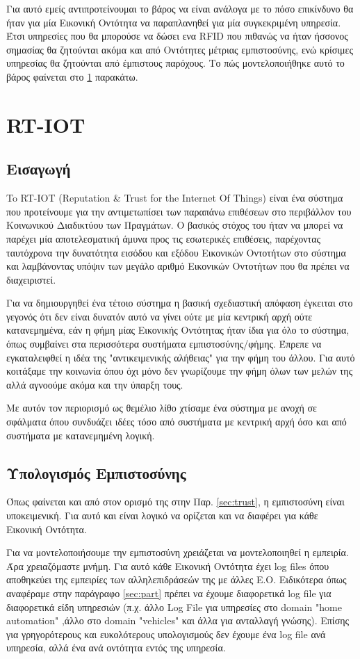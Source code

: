 Για αυτό εμείς αντιπροτείνουμαι το βάρος να είναι ανάλογα με το πόσο επικίνδυνο θα ήταν για μία Εικονική Οντότητα να παραπλανηθεί για μία συγκεκριμένη υπηρεσία. Έτσι υπηρεσίες που θα μπορούσε να δώσει ενα RFID  που πιθανώς να ήταν ήσσονος σημασίας θα ζητούνται ακόμα και από Οντότητες μέτριας εμπιστοσύνης, ενώ κρίσιμες υπηρεσίας θα ζητούνται από έμπιστους παρόχους. Το πώς μοντελοποιήθηκε αυτό το βάρος φαίνεται στο \ref{sec:RT-IOT} παρακάτω.
\newpage
\section{RT-IOT}\label{sec:RT-IOT}
\subsection{Εισαγωγή}
To RT-IOT (Reputation \& Trust for the Internet Of Things) είναι ένα σύστημα που προτείνουμε για την αντιμετωπίσει των παραπάνω επιθέσεων στο περιβάλλον του Κοινωνικού Διαδικτύου των Πραγμάτων. Ο βασικός στόχος του ήταν να μπορεί να παρέχει μία αποτελεσματική άμυνα προς τις εσωτερικές επιθέσεις, παρέχοντας ταυτόχρονα την δυνατότητα εισόδου και εξόδου Εικονικών Οντοτήτων στο σύστημα 
και λαμβάνοντας υπόψιν των μεγάλο αριθμό Εικονικών Οντοτήτων που θα πρέπει να διαχειριστεί.

Για να δημιουργηθεί ένα τέτοιο σύστημα η βασική σχεδιαστική απόφαση έγκειται στο γεγονός ότι δεν είναι δυνατόν αυτό να γίνει ούτε με μία κεντρική αρχή ούτε κατανεμημένα, εάν η φήμη μίας Εικονικής Οντότητας ήταν ίδια για όλο το σύστημα, όπως συμβαίνει στα περισσότερα συστήματα εμπιστοσύνης/φήμης. Έπρεπε να εγκαταλειφθεί η ιδέα της "αντικειμενικής αλήθειας" για την φήμη του άλλου. Για αυτό κοιτάξαμε την κοινωνία όπου όχι μόνο δεν γνωρίζουμε την φήμη όλων των μελών της αλλά αγνοούμε ακόμα και την ύπαρξη τους.

Με αυτόν τον περιορισμό ως θεμέλιο λίθο χτίσαμε ένα σύστημα με ανοχή σε σφάλματα όπου συνδυάζει ιδέες τόσο από συστήματα με κεντρική αρχή όσο και από συστήματα με κατανεμημένη λογική.

\subsection{Υπολογισμός Εμπιστοσύνης}\label{sec:calculate_trust}
Όπως φαίνεται και από στον ορισμό της στην Παρ. \ref{sec:trust}, η εμπιστοσύνη είναι υποκειμενική. Για αυτό και είναι λογικό να ορίζεται και να διαφέρει για κάθε Εικονική Οντότητα.

Για να μοντελοποιήσουμε την εμπιστοσύνη χρειάζεται να μοντελοποιηθεί η εμπειρία. Άρα χρειαζόμαστε μνήμη. Για αυτό κάθε Εικονική Οντότητα έχει log files όπου αποθηκεύει της εμπειρίες των αλληλεπιδράσεών της με άλλες Ε.Ο. Ειδικότερα όπως αναφέραμε στην παράγραφο \ref{sec:part} πρέπει να έχουμε διαφορετικά log file για διαφορετικά είδη υπηρεσιών (π.χ. άλλο Log File για υπηρεσίες στο domain "home automation" ,άλλο  στο domain "vehicles" και άλλα για ανταλλαγή γνώσης). Επίσης για γρηγορότερους και ευκολότερους υπολογισμούς δεν έχουμε ένα log file ανά υπηρεσία, αλλά ένα ανά οντότητα εντός της υπηρεσία.

